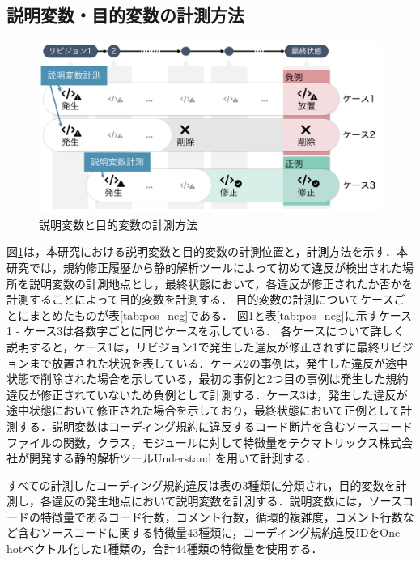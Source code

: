 \documentclass[submit,noauthor,dvipdfmx]{ipsj}
\begin{document}
\subsection{説明変数・目的変数の計測方法}


\begin{figure}[t]
	\centering
	\includegraphics[width=1.0\linewidth]{Kameoka_fig/kameoka_fig2.pdf}
	\caption{説明変数と目的変数の計測方法}
	\label{fig:mokutekihensu}
\end{figure}

図\ref{fig:mokutekihensu}は，本研究における説明変数と目的変数の計測位置と，計測方法を示す．本研究では，規約修正履歴から静的解析ツールによって初めて違反が検出された場所を説明変数の計測地点とし，最終状態において，各違反が修正されたか否かを計測することによって目的変数を計測する．
目的変数の計測についてケースごとにまとめたものが表\ref{tab:pos_neg}である．
図\ref{fig:mokutekihensu}と表\ref{tab:pos_neg}に示すケース1 - ケース3は各数字ごとに同じケースを示している．
各ケースについて詳しく説明すると，ケース1は，リビジョン1で発生した違反が修正されずに最終リビジョンまで放置された状況を表している．ケース2の事例は，発生した違反が途中状態で削除された場合を示している，最初の事例と2つ目の事例は発生した規約違反が修正されていないため負例として計測する．ケース3は，発生した違反が途中状態において修正された場合を示しており，最終状態において正例として計測する．説明変数はコーディング規約に違反するコード断片を含むソースコードファイルの関数，クラス，モジュールに対して特徴量をテクマトリックス株式会社が開発する静的解析ツールUnderstand
を用いて計測する．

すべての計測したコーディング規約違反は表の3種類に分類され，目的変数を計測し，各違反の発生地点において説明変数を計測する．説明変数には，ソースコードの特徴量であるコード行数，コメント行数，循環的複雑度，コメント行数など含むソースコードに関する特徴量43種類に，コーディング規約違反IDをOne-hotベクトル化した1種類の，合計44種類の特徴量を使用する．
\end{document}
